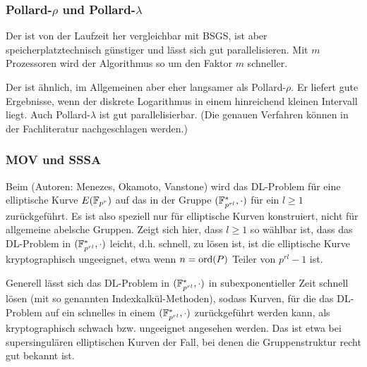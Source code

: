 \subsubsection{Pollard-$\rho$ und Pollard-$\lambda$}
\label{subsub:4.1.2}
\begin{bem}
	Der  ist von der Laufzeit her vergleichbar mit BSGS, ist aber speicherplatztechnisch günstiger und lässt sich gut parallelisieren.
	Mit $m$ Prozessoren wird der Algorithmus so um den Faktor $m$ schneller. 
\end{bem}

\begin{bem}
	Der  ist ähnlich, im Allgemeinen aber eher langsamer als Pollard-$\rho$.
	Er liefert gute Ergebnisse, wenn der diskrete Logarithmus in einem hinreichend kleinen Intervall liegt.
	Auch Pollard-$\lambda$ ist gut parallelisierbar.
	(Die genauen Verfahren können in der Fachliteratur nachgeschlagen werden.) 
\end{bem}

\subsubsection{MOV und SSSA}
\label{subsub:4.1.3}
\begin{bem}
	Beim  (Autoren: Menezes, Okamoto, Vanstone) wird das DL-Problem für eine elliptische Kurve $E(\mathbb{F}_{p^r})$ auf das in der Gruppe $(\mathbb{F}_{p^{rl}}^*,\cdot)$ für ein $l \geq 1$ zurückgeführt.
	Es ist also speziell nur für elliptische Kurven konstruiert, nicht für allgemeine abelsche Gruppen.
	Zeigt sich hier, dass $l \geq 1$ so wählbar ist, dass das DL-Problem in $(\mathbb{F}_{p^{rl}}^*,\cdot)$ leicht, d.h. schnell, zu lösen ist, ist die elliptische Kurve kryptographisch ungeeignet, etwa wenn $n = \operatorname{ord}(P)$ Teiler von $p^{rl} - 1$ ist.
\end{bem}

\begin{bem}
	Generell lässt sich das DL-Problem in $(\mathbb{F}_{p^{rl}}^*,\cdot)$ in subexponentieller Zeit schnell lösen (mit so genannten Indexkalkül-Methoden), sodass Kurven, für die das DL-Problem auf ein schnelles in einem $(\mathbb{F}_{p^{rl}}^*,\cdot)$ zurückgeführt werden kann, als kryptographisch schwach bzw. ungeeignet angesehen werden.
	Das ist etwa bei supersingulären elliptischen Kurven der Fall, bei denen die Gruppenstruktur recht gut bekannt ist.
\end{bem}

